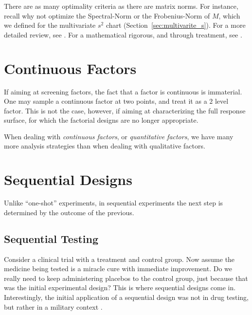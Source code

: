 \begin{extra}
	There are as many optimality criteria as there are matrix norms. 
	For instance, recall why not optimize the Spectral-Norm or the Frobenius-Norm of $M$, which we defined for the multivariate $s^2$ chart (Section~\ref{sec:multivarite_s}). 
	For a more detailed review, see \cite{wikipedia_optimal_2015}.
	For a mathematical rigorous, and through treatment, see \cite{pukelsheim_optimal_1993}.
\end{extra}








\section{Continuous Factors}
\label{sec:continouos_factors}

If aiming at screening factors, the fact that a factor is continuous is immaterial. 
One may sample a continuous factor at two points, and treat it as a $2$ level factor.
This is not the case, however, if aiming at characterizing the full response surface, for which the factorial designs are no longer appropriate. 

When dealing with \emph{continuous factors}, or \emph{quantitative factors}, we have many more analysis strategies than when dealing with qualitative factors.










\section{Sequential Designs}
\label{sec:sequantial}


Unlike ``one-shot'' experiments, in sequential experiments the next step is determined by the outcome of the previous. 





\subsection{Sequential Testing}

Consider a clinical trial with a treatment and control group.
Now assume the medicine being tested is a miracle cure with immediate improvement. 
Do we really need to keep administering placebos to the control group, just because that was the initial experimental design?
This is where sequential designs come in.
Interestingly, the initial application of a sequential design was not in drug testing, but rather in a military context \citep{wald_sequential_1945}.

